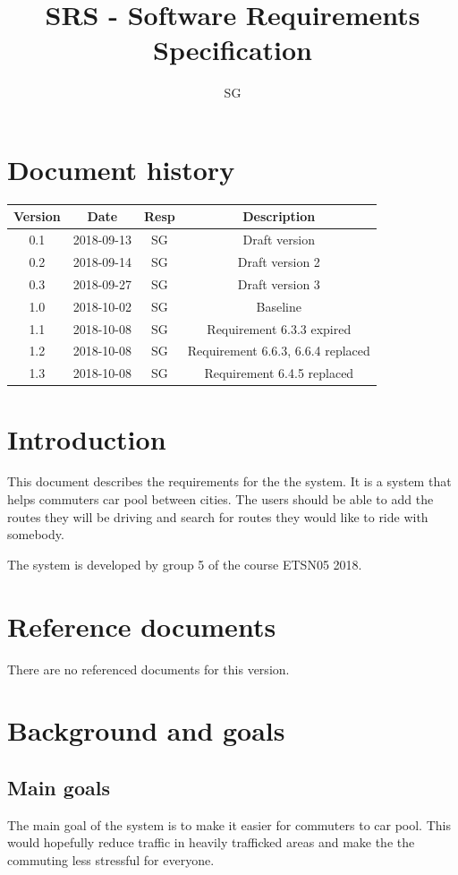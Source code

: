 \documentclass{article}
\title{SRS - Software Requirements Specification}
\begin{document}
\author{SG}

\maketitle
\thispagestyle{fancy}
\tableofcontents
\newpage

\section*{Document history}
 \begin{tabular}{||c c c c||} 
 \hline
 Version & Date & Resp & Description \\ [0.5ex] 
 \hline\hline
 0.1 & 2018-09-13 & SG & Draft version \\ 
 0.2 & 2018-09-14 & SG & Draft version 2 \\
 0.3 & 2018-09-27 & SG & Draft version 3 \\
 1.0 & 2018-10-02 & SG & Baseline \\
 1.1 & 2018-10-08 & SG & Requirement 6.3.3 expired \\
 1.2 & 2018-10-08 & SG & Requirement 6.6.3, 6.6.4 replaced \\
 1.3 & 2018-10-08 & SG & Requirement 6.4.5 replaced \\
 \hline
 

\end{tabular}

\section{Introduction}
This document describes the requirements for the the system. It is a system that helps commuters car pool between cities. The users should be able to add the routes they will be driving and search for routes they would like to ride with somebody.

The system is developed by group 5 of the course ETSN05 2018.

\section{Reference documents}
There are no referenced documents for this version.
\section{Background and goals}

\subsection{Main goals}
The main goal of the system is to make it easier for commuters to car pool. This would hopefully reduce traffic in heavily trafficked areas and make the the commuting less stressful for everyone.  
\end{document}
